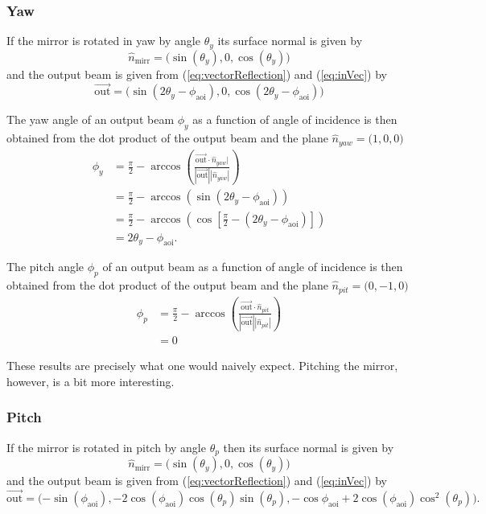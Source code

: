\documentclass[12pt]{article}
\newcommand{\threeVec}[3]{\big( {#1}, {#2}, {#3} \big)}
\newcommand{\myVec}[1]{\vec{#1}}
\begin{document}
\subsubsection{Yaw}
If the mirror is rotated in yaw by angle $\theta_y$ its surface normal
is given by
\begin{equation}
  \hat{n}_\mathrm{mirr} = \big(\sin(\theta_y),0,\cos(\theta_y)\big)
\end{equation}
and the output beam is given from (\ref{eq:vectorReflection}) and
(\ref{eq:inVec}) by
\begin{equation}
  \myVec{\mathrm{out}} = \threeVec{\sin(2\theta_y-\phi_\mathrm{aoi})}{0}{\cos(2\theta_y-\phi_\mathrm{aoi})}
\end{equation}

The yaw angle of an output beam $\phi_y$ as a function of angle of
incidence is then obtained from the dot product of the output beam and
the plane $\hat{n}_{yaw}=\threeVec{1}{0}{0}$
\begin{align}
  \phi_y &= \frac{\pi}{2} - \arccos\left(\frac{\myVec{\mathrm{out}}\cdot\hat{n}_{yaw}|}{|\myVec{\mathrm{out}}||\hat{n}_{yaw}|}\right)\\
  &=\frac{\pi}{2} - \arccos\left( \sin(2\theta_y-\phi_\mathrm{aoi}) \right)\\
  &=\frac{\pi}{2} - \arccos\left( \cos\left[\frac{\pi}{2}-(2\theta_y-\phi_\mathrm{aoi})\right] \right)\\
&=2\theta_y-\phi_\mathrm{aoi}.
\end{align}

The pitch angle $\phi_p$ of an output beam as a function of angle of
incidence is then obtained from the dot product of the output beam and
the plane $\hat{n}_{pit}=\threeVec{0}{-1}{0}$
\begin{align}
  \phi_p &= \frac{\pi}{2} - \arccos\left(\frac{\myVec{\mathrm{out}}\cdot\hat{n}_{pit}}{|\myVec{\mathrm{out}}||\hat{n}_{pit}|}\right)\\
  &=0
\end{align}

These results are precisely what one would naively expect. Pitching
the mirror, however, is a bit more interesting.

\subsubsection{Pitch}
If the mirror is rotated in pitch by angle $\theta_p$ then its surface
normal is given by
\begin{equation}
  \hat{n}_\mathrm{mirr} = \big(\sin(\theta_y),0,\cos(\theta_y)\big)
\end{equation}
and the output beam is given from (\ref{eq:vectorReflection}) and
(\ref{eq:inVec}) by
\begin{equation}
  \myVec{\mathrm{out}} = \threeVec{-\sin(\phi_\mathrm{aoi})}{-2\cos(\phi_\mathrm{aoi})\cos(\theta_p)\sin(\theta_p)}{-\cos{\phi_\mathrm{aoi}}+2\cos(\phi_\mathrm{aoi})\cos^2(\theta_p)}.
\end{equation}
\end{document}
